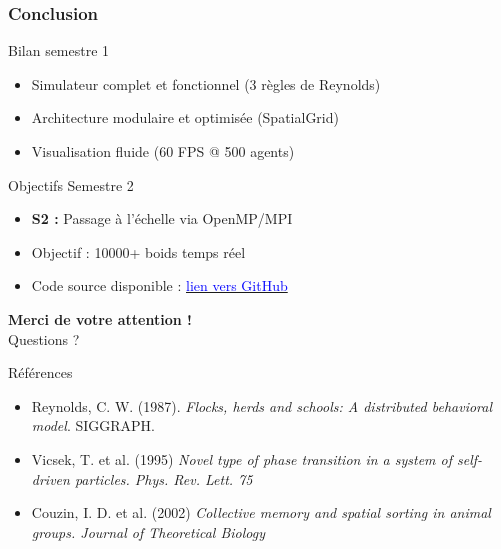 \documentclass[aspectratio=169]{beamer}
\begin{document}
\begin{frame}
\frametitle{Conclusion}

\begin{block}{Bilan semestre 1}
\begin{itemize}
\setlength\itemsep{1em}
    \item Simulateur complet et fonctionnel (3 règles de Reynolds)
    \item Architecture modulaire et optimisée (SpatialGrid)
    \item Visualisation fluide (60 FPS @ 500 agents)  
\end{itemize}
\end{block}

\begin{alertblock}{Objectifs Semestre 2}
\begin{itemize}
\setlength\itemsep{1em}
    \item \textbf{S2 :} Passage à l'échelle via OpenMP/MPI
    \item Objectif : 10000+ boids temps réel
    \item Code source disponible : \href{https://github.com/iramyas/Mod-lisation-et-simulation-distribu-e-du-mouvement-d-un-banc-de-poissons.git}{\textcolor{blue}{lien vers GitHub}}
\end{itemize}
\end{alertblock}


\end{frame}

\begin{frame}[standout]
\centering
\Huge {\textbf{Merci de votre attention !}} \\
\vspace{1.cm}
\Large Questions ?
\vspace{0.5cm}
\end{frame}

\begin{frame}{Références}
\small
\begin{itemize}
    \item Reynolds, C. W. (1987). \textit{Flocks, herds and schools: A distributed behavioral model}. SIGGRAPH.
    \item Vicsek, T. et al. (1995) \textit{Novel type of phase transition in a system of self-driven
particles. Phys. Rev. Lett. 75}
    \item Couzin, I. D. et al. (2002) \textit{Collective memory and spatial sorting in animal
groups. Journal of Theoretical Biology}
\end{itemize}
\end{frame}
\end{document}
